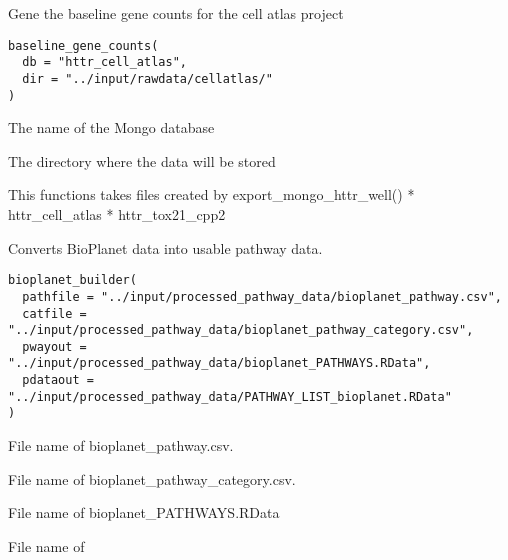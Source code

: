 \documentclass[letterpaper]{book}
\begin{document}
%
\begin{Description}\relax
Gene the baseline gene counts for the cell atlas project
\end{Description}
%
\begin{Usage}
\begin{verbatim}
baseline_gene_counts(
  db = "httr_cell_atlas",
  dir = "../input/rawdata/cellatlas/"
)
\end{verbatim}
\end{Usage}
%
\begin{Arguments}
\begin{ldescription}
\item[\code{db}] The name of the Mongo database

\item[\code{dir}] The directory where the data will be stored

This functions takes files created by export\_mongo\_httr\_well()
* httr\_cell\_atlas
* httr\_tox21\_cpp2
\end{ldescription}
\end{Arguments}
%
\begin{Description}\relax
Converts BioPlanet data into usable pathway data.
\end{Description}
%
\begin{Usage}
\begin{verbatim}
bioplanet_builder(
  pathfile = "../input/processed_pathway_data/bioplanet_pathway.csv",
  catfile = "../input/processed_pathway_data/bioplanet_pathway_category.csv",
  pwayout = "../input/processed_pathway_data/bioplanet_PATHWAYS.RData",
  pdataout = "../input/processed_pathway_data/PATHWAY_LIST_bioplanet.RData"
)
\end{verbatim}
\end{Usage}
%
\begin{Arguments}
\begin{ldescription}
\item[\code{pathfile}] File name of bioplanet\_pathway.csv.

\item[\code{catfile}] File name of bioplanet\_pathway\_category.csv.

\item[\code{pwayout}] File name of bioplanet\_PATHWAYS.RData

\item[\code{pdataout}] File name of
\end{ldescription}
\end{Arguments}
\end{document}
